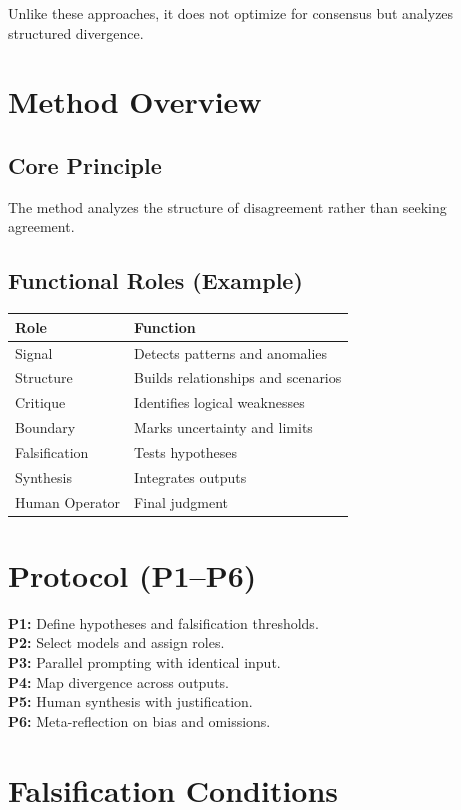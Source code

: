 \documentclass[11pt]{article}
\begin{document}
Unlike these approaches, it does not optimize for consensus but analyzes structured divergence.

\section{Method Overview}

\subsection{Core Principle}

The method analyzes the structure of disagreement rather than seeking agreement.

\subsection{Functional Roles (Example)}

\begin{tabular}{ll}
\toprule
Role & Function \\
\midrule
Signal & Detects patterns and anomalies \\
Structure & Builds relationships and scenarios \\
Critique & Identifies logical weaknesses \\
Boundary & Marks uncertainty and limits \\
Falsification & Tests hypotheses \\
Synthesis & Integrates outputs \\
Human Operator & Final judgment \\
\bottomrule
\end{tabular}

\section{Protocol (P1--P6)}

\textbf{P1:} Define hypotheses and falsification thresholds.\\
\textbf{P2:} Select models and assign roles.\\
\textbf{P3:} Parallel prompting with identical input.\\
\textbf{P4:} Map divergence across outputs.\\
\textbf{P5:} Human synthesis with justification.\\
\textbf{P6:} Meta-reflection on bias and omissions.

\section{Falsification Conditions}
\end{document}
